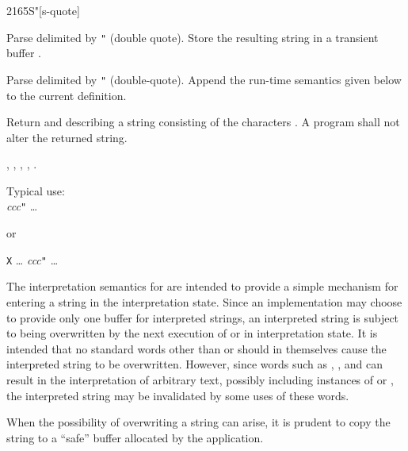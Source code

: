\pagebreak
\begin{worddef}[Sq]{2165}{S"}[s-quote]
\interpret

	Parse  delimited by \texttt{"} (double quote).
	Store the resulting string in a transient buffer .

\compile

	Parse  delimited by \texttt{"} (double-quote).
	Append the run-time semantics given below to the current
	definition.

\runtime

	Return  and  describing a string
	consisting of the characters . A program shall
	not alter the returned string.

\see {},
	,
	,
	,
	.

	\begin{rationale} %
		Typical use: \\
			\tab {\ldots}  \emph{ccc}\texttt{"} {\ldots} \par
			or \par
			\tab \word{:} \texttt{X} {\ldots}
				 \emph{ccc}\texttt{"}
			{\ldots} \word{;}

		The interpretation semantics for  are intended to
		provide a simple mechanism for entering a string in the
		interpretation state. Since an implementation may choose to
		provide only one buffer for interpreted strings, an
		interpreted string is subject to being overwritten by the
		next execution of  or  in interpretation
		state. It is intended that no standard words other than
		 or  should in themselves cause the
		interpreted string to be overwritten.
		However, since words such as ,
		,  and
		 can result in the interpretation of arbitrary
		text, possibly including instances of  or ,
		the interpreted string may be invalidated by some uses of these
		words.

		When the possibility of overwriting a string can arise, it is
		prudent to copy the string to a ``safe'' buffer allocated by
		the application.
	\end{rationale}

	\begin{testing} %
		 \\
		 \\


\end{testing}
\end{worddef}
